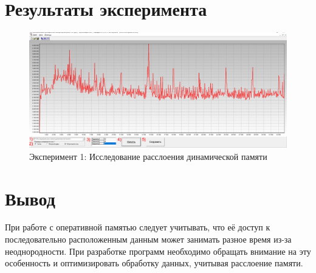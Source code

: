 \section{Результаты эксперимента}
\begin{figure}[ht!]
    \centering
    \includegraphics[width=170mm]{./img/1.png}
    \caption{Эксперимент 1: Исследование расслоения динамической памяти\label{overflow1}}
\end{figure}

\section{Вывод}
При работе с оперативной памятью следует учитывать, что её доступ к последовательно расположенным данным может занимать разное время из-за неоднородности. 
При разработке программ необходимо обращать внимание на эту особенность и оптимизировать обработку данных, учитывая расслоение памяти.